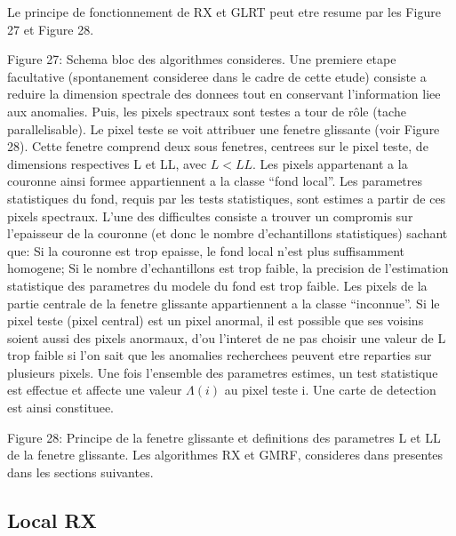 Le principe de fonctionnement de RX et GLRT peut etre resume par les
Figure 27 et Figure 28.

Figure 27: Schema bloc des algorithmes consideres.  Une premiere etape
facultative (spontanement consideree dans le cadre de cette etude)
consiste a reduire la dimension spectrale des donnees tout en
conservant l'information liee aux anomalies. Puis, les pixels
spectraux sont testes a tour de rôle (tache parallelisable). Le pixel
teste se voit attribuer une fenetre glissante (voir Figure 28). Cette
fenetre comprend deux sous fenetres, centrees sur le pixel teste, de
dimensions respectives L et LL, avec $L < LL$.  Les pixels appartenant a
la couronne ainsi formee appartiennent a la classe ``fond local''. Les
parametres statistiques du fond, requis par les tests statistiques,
sont estimes a partir de ces pixels spectraux. L'une des difficultes
consiste a trouver un compromis sur l'epaisseur de la couronne (et
donc le nombre d'echantillons statistiques) sachant que: Si la
couronne est trop epaisse, le fond local n'est plus suffisamment
homogene; Si le nombre d'echantillons est trop faible, la precision
de l'estimation statistique des parametres du modele du fond est trop
faible.  Les pixels de la partie centrale de la fenetre glissante
appartiennent a la classe ``inconnue''. Si le pixel teste (pixel
central) est un pixel anormal, il est possible que ses voisins soient
aussi des pixels anormaux, d'ou l'interet de ne pas choisir une valeur
de L trop faible si l'on sait que les anomalies recherchees peuvent
etre reparties sur plusieurs pixels.  Une fois l'ensemble des
parametres estimes, un test statistique est effectue et affecte une
valeur $\Lambda(i)$ au pixel teste i. Une carte de detection est ainsi
constituee.

Figure 28: Principe de la fenetre glissante et definitions des
parametres L et LL de la fenetre glissante.  Les algorithmes RX et
GMRF, consideres dans presentes dans les sections suivantes.

\subsection{Local RX}
